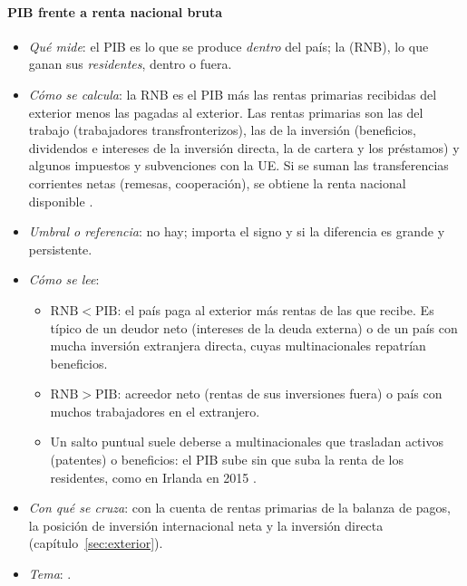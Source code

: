 \documentclass[11pt]{article}
\begin{document}
\paragraph{PIB frente a renta nacional bruta}
\begin{itemize}
\item \emph{Qué mide}: el PIB es lo que se produce \emph{dentro} del país; la  (RNB), lo que ganan sus \emph{residentes}, dentro o fuera.
\item \emph{Cómo se calcula}: la RNB es el PIB más las rentas primarias recibidas del exterior menos las pagadas al exterior. Las rentas primarias son las del trabajo (trabajadores transfronterizos), las de la inversión (beneficios, dividendos e intereses de la inversión directa, la de cartera y los préstamos) y algunos impuestos y subvenciones con la UE. Si se suman las transferencias corrientes netas (remesas, cooperación), se obtiene la renta nacional disponible \parencite{SEC2010}.
\item \emph{Umbral o referencia}: no hay; importa el signo y si la diferencia es grande y persistente.
\item \emph{Cómo se lee}:
  \begin{itemize}
  \item $\mathrm{RNB}<\mathrm{PIB}$: el país paga al exterior más rentas de las que recibe. Es típico de un deudor neto (intereses de la deuda externa) o de un país con mucha inversión extranjera directa, cuyas multinacionales repatrían beneficios.
  \item $\mathrm{RNB}>\mathrm{PIB}$: acreedor neto (rentas de sus inversiones fuera) o país con muchos trabajadores en el extranjero.
  \item Un salto puntual suele deberse a multinacionales que trasladan activos (patentes) o beneficios: el PIB sube sin que suba la renta de los residentes, como en Irlanda en 2015 \parencite{Eurostat2026nama10gdp}.
  \end{itemize}
\item \emph{Con qué se cruza}: con la cuenta de rentas primarias de la balanza de pagos, la posición de inversión internacional neta y la inversión directa (capítulo~\ref{sec:exterior}).
\item \emph{Tema}:   .
\end{itemize}
\end{document}
